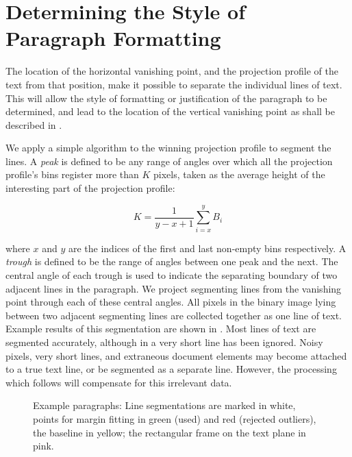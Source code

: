 

\section{Determining the Style of Paragraph Formatting} \label{sec-parags}

The location of the horizontal vanishing point, and the projection profile of
the text from that position, make it possible to separate the individual lines
of text.  This will allow the style of formatting or justification of the
paragraph to be determined, and lead to the location of the vertical vanishing
point as shall be described in .

We apply a simple algorithm to the winning projection profile to segment the
lines.  A {\em peak} is defined to be any range of angles over which all the
projection profile's bins register more than $K$ pixels, taken as the average
height of the interesting part of the projection profile:

\begin{equation}
K= \frac{1}{y-x+1} \sum_{i=x}^{y}B_i
\end{equation}

{\parindent 0mm
where $x$ and $y$ are the indices of the first and last non-empty bins respectively.
A {\em trough} is defined to be the range of angles between one peak and the next.  
The central angle of each trough is used to indicate the separating boundary of
two adjacent lines in the paragraph.  We project segmenting lines from the
vanishing point through each of these central angles.
All pixels in the binary image lying between two adjacent segmenting
lines are collected together as one line of text. Example results of this
segmentation are shown in .  Most lines of
text are segmented accurately, although in  a very short
line has been ignored.  Noisy pixels, very short lines, and extraneous document
elements may become attached to a true text line, or be segmented as a separate
line.  However, the processing which follows will compensate for this irrelevant
data. 
} 


\begin{figure}[t]
\centering
\begin{center}
\hspace{2mm}
\end{center}
\vspace*{0mm}
\caption{Example paragraphs: 
Line segmentations are marked in white, points for margin fitting in green
(used) and red (rejected outliers), the baseline in yellow;
the rectangular frame on the text plane in pink.}
\label{linesegfig}
\label{summaryfig}
\end{figure}



